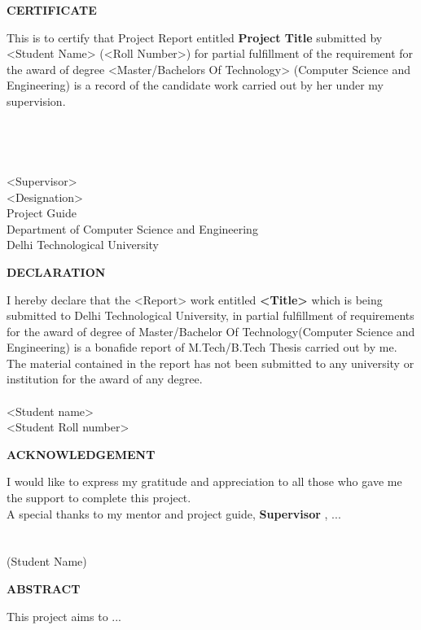 \documentclass[12pt,a4paper]{report}
\begin{document}
		\pagebreak
		
		
		\newpage
		\setcounter{page}{1}
		\pagestyle{plain}
		

		
\clearpage
	   
\begin{center}
	{\large \bf CERTIFICATE}
	\end{center}

This is to certify that Project Report entitled { \bf 
Project Title} submitted by <Student Name> (<Roll Number>) for partial fulfillment of the requirement for the award of degree <Master/Bachelors Of Technology> (Computer Science and Engineering) is a record of the candidate work carried out by her under my supervision.\\ \\ \\ \\ \\
<Supervisor>\\
<Designation>\\								  	    
Project Guide\\
Department of Computer Science and Engineering \\
Delhi Technological University

\clearpage
\begin{center}
	{\large \bf DECLARATION}
\end{center}
I hereby declare that the <Report> work entitled { \bf <Title>} which is being submitted to Delhi Technological University, in partial fulfillment of requirements for the award of degree of Master/Bachelor Of Technology(Computer Science and Engineering) is a bonafide report of M.Tech/B.Tech Thesis carried out by me. The material contained in the report has not been submitted to any university or institution for the award of any degree.\\ \\
<Student name>\\ 
<Student Roll number>

\clearpage
\begin{center}
{\large \bf ACKNOWLEDGEMENT}
\end{center}
I would like to express my gratitude and appreciation to all those who gave me the support to complete this project.\\ 
A special thanks to my mentor and project guide, {\bf Supervisor }, ... \\ \\ \\
\vspace{0.7in}
(Student Name) \hspace{1in}
\clearpage
\begin{center}
	{\large \bf ABSTRACT}
	\end{center}
This project aims to ...
\clearpage
\newpage
\tableofcontents
\end{document}
